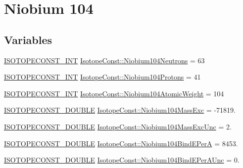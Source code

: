 \hypertarget{group___isotope_const-_niobium-_nb104}{}\section{Niobium 104}
\label{group___isotope_const-_niobium-_nb104}
\subsection*{Variables}
\begin{DoxyCompactItemize}
\item 
\mbox{\hyperlink{group___isotope_const-_macros_ga5f18360b3e99483a35c32d789e62621c}{I\+S\+O\+T\+O\+P\+E\+C\+O\+N\+S\+T\+\_\+\+I\+NT}} \mbox{\hyperlink{group___isotope_const-_niobium-_nb104_ga0e5519ee6c0ca4fab7f4f221381961f0}{Isotope\+Const\+::\+Niobium104\+Neutrons}} = 63
\item 
\mbox{\hyperlink{group___isotope_const-_macros_ga5f18360b3e99483a35c32d789e62621c}{I\+S\+O\+T\+O\+P\+E\+C\+O\+N\+S\+T\+\_\+\+I\+NT}} \mbox{\hyperlink{group___isotope_const-_niobium-_nb104_gaf194156b730dcd738361a25511f0a490}{Isotope\+Const\+::\+Niobium104\+Protons}} = 41
\item 
\mbox{\hyperlink{group___isotope_const-_macros_ga5f18360b3e99483a35c32d789e62621c}{I\+S\+O\+T\+O\+P\+E\+C\+O\+N\+S\+T\+\_\+\+I\+NT}} \mbox{\hyperlink{group___isotope_const-_niobium-_nb104_ga5d455950222a0de61df9478f396859a6}{Isotope\+Const\+::\+Niobium104\+Atomic\+Weight}} = 104
\item 
\mbox{\hyperlink{group___isotope_const-_macros_ga8f45a7272ce02c0b4c65c44636ed719a}{I\+S\+O\+T\+O\+P\+E\+C\+O\+N\+S\+T\+\_\+\+D\+O\+U\+B\+LE}} \mbox{\hyperlink{group___isotope_const-_niobium-_nb104_ga067e52482141dd57fbad6f90f93b2134}{Isotope\+Const\+::\+Niobium104\+Mass\+Exc}} = -\/71819.
\item 
\mbox{\hyperlink{group___isotope_const-_macros_ga8f45a7272ce02c0b4c65c44636ed719a}{I\+S\+O\+T\+O\+P\+E\+C\+O\+N\+S\+T\+\_\+\+D\+O\+U\+B\+LE}} \mbox{\hyperlink{group___isotope_const-_niobium-_nb104_gaf9b4e6711942aa9c4f66b31b9e8cea63}{Isotope\+Const\+::\+Niobium104\+Mass\+Exc\+Unc}} = 2.
\item 
\mbox{\hyperlink{group___isotope_const-_macros_ga8f45a7272ce02c0b4c65c44636ed719a}{I\+S\+O\+T\+O\+P\+E\+C\+O\+N\+S\+T\+\_\+\+D\+O\+U\+B\+LE}} \mbox{\hyperlink{group___isotope_const-_niobium-_nb104_ga6ec5441b165e9317c9ae5b968e8c5767}{Isotope\+Const\+::\+Niobium104\+Bind\+E\+PerA}} = 8453.
\item 
\mbox{\hyperlink{group___isotope_const-_macros_ga8f45a7272ce02c0b4c65c44636ed719a}{I\+S\+O\+T\+O\+P\+E\+C\+O\+N\+S\+T\+\_\+\+D\+O\+U\+B\+LE}} \mbox{\hyperlink{group___isotope_const-_niobium-_nb104_ga6bc52d5feb4f1b8fdf6754f0db19ff52}{Isotope\+Const\+::\+Niobium104\+Bind\+E\+Per\+A\+Unc}} = 0.

\end{DoxyCompactItemize}
